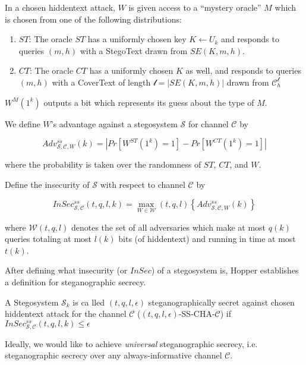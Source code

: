 \begin{definition}
In a chosen hiddentext attack, $W$ is given access to a ``mystery oracle'' $M$ which is chosen from one of the following distributions:

\begin{enumerate}
\item $ST$: The oracle $ST$ has a uniformly chosen key $K \leftarrow U_k$ and responds to queries $(m, h)$ with a StegoText drawn from $SE(K, m, h)$.
\item $CT$: The oracle $CT$ has a uniformly chosen $K$ as well, and responds to queries $(m, h)$ with a CoverText of length $\mathcal{l} = |SE(K, m, h)|$ drawn from $\mathcal{C}_h^{\mathcal{l}}$
\end{enumerate}

$W^M(1^k)$ outputs a bit which represents its guess about the type of $M$.

We define $W$'s advantage against a stegosystem $\mathcal{S}$ for channel $\mathcal{C}$ by

$$Adv_{\mathcal{S}, \mathcal{C}, W}^{ss}(k) = |Pr[W^{ST}(1^k)=1] - Pr[W^{CT}(1^k)=1]|$$

where the probability is taken over the randomness of $ST$, $CT$, and $W$. 

Define the insecurity of $\mathcal{S}$ with respect to channel $\mathcal{C}$ by

$$InSec_{\mathcal{S}, \mathcal{C}}^{ss}(t, q, l, k) = \max_{W \in \mathcal{W}}(t, q, l) \left\{ Adv_{\mathcal{S}, \mathcal{C}, W}^{ss}(k) \right\}$$

where $\mathcal{W}(t, q, l)$ denotes the set of all adversaries which make at most $q(k)$ queries totaling at most $l(k)$ bits (of hiddentext) and running in time at most $t(k)$.
\end{definition}

After defining what insecurity (or $InSec$) of a stegosystem is, Hopper establishes a definition for steganographic secrecy.

\begin{definition}
A Stegosystem $\mathcal{S}_k$ is ca	lled $(t,q,l,\epsilon)$ steganographically secret against chosen hiddentext attack for the channel $\mathcal{C}$ ($(t,q,l,\epsilon)$-SS-CHA-$\mathcal{C}$) if $InSec_{\mathcal{S},\mathcal{C}}^{ss}(t,q,l,k) \leq \epsilon$
\end{definition}

Ideally, we would like to achieve \emph{universal} steganographic secrecy, i.e. steganographic secrecy over any always-informative channel $\mathcal{C}$.

